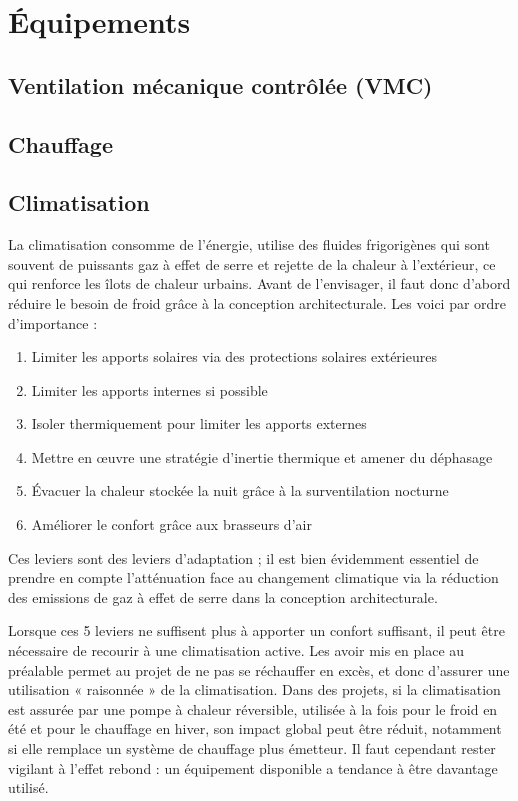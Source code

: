 \chapter{Équipements}

\section{Ventilation mécanique contrôlée (VMC)}

\section{Chauffage}

\section{Climatisation}

La climatisation consomme de l'énergie, utilise des fluides frigorigènes qui sont souvent de puissants gaz à effet de serre et rejette de la chaleur à l'extérieur, ce qui renforce les îlots de chaleur urbains. Avant de l'envisager, il faut donc d'abord réduire le besoin de froid grâce à la conception architecturale. Les voici par ordre d'importance :
\begin{enumerate}
    \item Limiter les apports solaires via des protections solaires extérieures
    \item Limiter les apports internes si possible
    \item Isoler thermiquement pour limiter les apports externes
    \item Mettre en œuvre une stratégie d'inertie thermique et amener du déphasage
    \item Évacuer la chaleur stockée la nuit grâce à la surventilation nocturne
    \item Améliorer le confort grâce aux brasseurs d'air 
\end{enumerate}
Ces leviers sont des leviers d'adaptation ; il est bien évidemment essentiel de prendre en compte l'atténuation face au changement climatique via la réduction des emissions de gaz à effet de serre dans la conception architecturale.

Lorsque ces 5 leviers ne suffisent plus à apporter un confort suffisant, il peut être nécessaire de recourir à une climatisation active. Les avoir mis en place au préalable permet au projet de ne pas se réchauffer en excès, et donc d'assurer une utilisation « raisonnée » de la climatisation. Dans des projets, si la climatisation est assurée par une pompe à chaleur réversible, utilisée à la fois pour le froid en été et pour le chauffage en hiver, son impact global peut être réduit, notamment si elle remplace un système de chauffage plus émetteur. Il faut cependant rester vigilant à l'effet rebond : un équipement disponible a tendance à être davantage utilisé.

